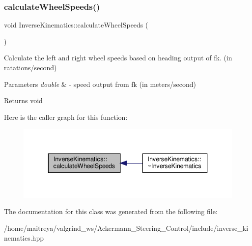 \subsubsection{\texorpdfstring{calculate\+Wheel\+Speeds()}{calculateWheelSpeeds()}}
{\footnotesize\ttfamily void Inverse\+Kinematics\+::calculate\+Wheel\+Speeds (\begin{DoxyParamCaption}\item[{double}]{ }\end{DoxyParamCaption})}



Calculate the left and right wheel speeds based on heading output of fk. (in ratations/second) 


\begin{DoxyParams}{Parameters}
{\em double} & -\/ speed output from fk (in meters/second) \\
\hline
\end{DoxyParams}
\begin{DoxyReturn}{Returns}
void 
\end{DoxyReturn}
Here is the caller graph for this function\+:
\nopagebreak
\begin{figure}[H]
\begin{center}
\leavevmode
\includegraphics[width=336pt]{classInverseKinematics_a7e72ae559e17363495da967d98fb7985_icgraph}
\end{center}
\end{figure}


The documentation for this class was generated from the following file\+:\begin{DoxyCompactItemize}
\item 
/home/maitreya/valgrind\+\_\+ws/\+Ackermann\+\_\+\+Steering\+\_\+\+Control/include/inverse\+\_\+kinematics.\+hpp\end{DoxyCompactItemize}
